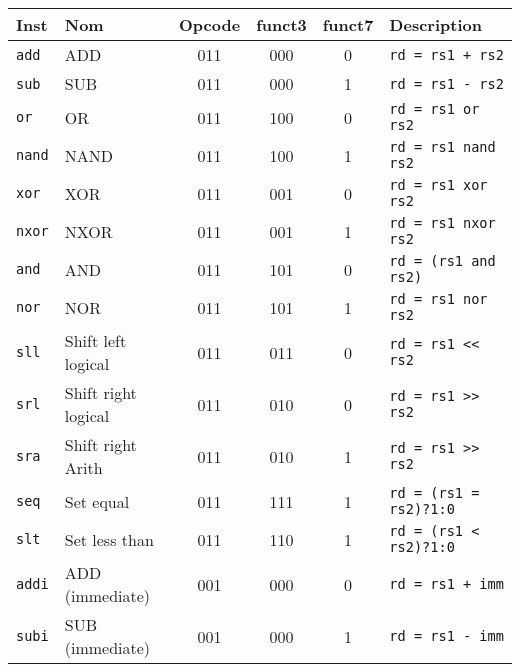 \documentclass[a4paper]{article}
\begin{document}
    \begin{longtable}{|l|l|c|c|c|l|}
        \hline
        Inst           & Nom                             & Opcode & funct3 & funct7 & Description                   \\
        \hline

        \texttt{add}   & ADD                             & 011    & 000    & 0      & \texttt{rd = rs1 + rs2}       \\
        \texttt{sub}   & SUB                             & 011    & 000    & 1      & \texttt{rd = rs1 - rs2}       \\
        \texttt{or}    & OR                              & 011    & 100    & 0      & \texttt{rd = rs1 or rs2}      \\
        \texttt{nand}  & NAND                            & 011    & 100    & 1      & \texttt{rd = rs1 nand rs2}    \\
        \texttt{xor}   & XOR                             & 011    & 001    & 0      & \texttt{rd = rs1 xor rs2}     \\
        \texttt{nxor}  & NXOR                            & 011    & 001    & 1      & \texttt{rd = rs1 nxor rs2}    \\
        \texttt{and}   & AND                             & 011    & 101    & 0      & \texttt{rd = (rs1 and rs2)}   \\
        \texttt{nor}   & NOR                             & 011    & 101    & 1      & \texttt{rd = rs1 nor rs2}     \\
        \texttt{sll}   & Shift left logical              & 011    & 011    & 0      & \texttt{rd = rs1 << rs2}      \\
        \texttt{srl}   & Shift right logical             & 011    & 010    & 0      & \texttt{rd = rs1 >> rs2}      \\
        \texttt{sra}   & Shift right Arith               & 011    & 010    & 1      & \texttt{rd = rs1 >> rs2}      \\
        \texttt{seq}   & Set equal                       & 011    & 111    & 1      & \texttt{rd = (rs1 = rs2)?1:0} \\
        \texttt{slt}   & Set less than                   & 011    & 110    & 1      & \texttt{rd = (rs1 < rs2)?1:0} \\
        \hline
        \texttt{addi}  & ADD (immediate)                 & 001    & 000    & 0      & \texttt{rd = rs1 + imm}       \\
        \texttt{subi}  & SUB (immediate)                 & 001    & 000    & 1      & \texttt{rd = rs1 - imm}       \\

\end{longtable}
\end{document}
